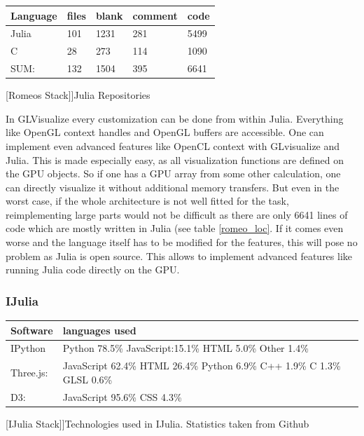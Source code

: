 \begin{table}[htbp]
    \centering
    \begin{tabular}{l|l|l|l|l}
        \hline
        \textbf{Language} & \textbf{files}    &   \textbf{blank}   &   \textbf{comment}    &  \textbf{code}\\
        \hline
        Julia  &  101   &    1231 &   281  &  5499\\
        C       &   28  &   273   &    114 &  1090\\
        \hline
        SUM: & 132  &  1504  &     395    &   6641\\
        \hline
    \end{tabular}
    [Romeos Stack]]{Julia Repositories}
    \label{table:romeo_loc}
\end{table}

In GLVisualize every customization can be done from within Julia.
Everything like OpenGL context handles and OpenGL buffers are accessible.
One can implement even advanced features like OpenCL context with GLvisualize and Julia.
This is made especially easy, as all visualization functions are defined on the GPU objects. So if one has a GPU array from some other calculation, one can directly visualize it without additional memory transfers.
But even in the worst case, if the whole architecture is not well fitted for the task, reimplementing large parts would not be difficult as there are only 6641 lines of code which are mostly written in Julia (see table \ref{romeo_loc}.
If it comes even worse and the language itself has to be modified for the features, this will pose no problem as Julia is open source.
This allows to implement advanced features like running Julia code directly on the \ac{GPU}.


\subsubsection{IJulia}


\begin{table}[htbp]
    \centering
    \begin{tabular}{l|l}
        \hline
        \textbf{Software} & \textbf{languages used}\\
        \hline
        IPython     & Python 78.5\% JavaScript:15.1\% HTML 5.0\% Other 1.4\%\\
        Three.js:   & JavaScript 62.4\% HTML 26.4\% Python 6.9\% C++ 1.9\% C 1.3\% GLSL 0.6\%\\
        D3:         & JavaScript 95.6\% CSS 4.3\%\\
        \hline
    \end{tabular}
    [IJulia Stack]]{Technologies used in IJulia. Statistics taken from Github}
    \label{table:ijuliastack}
\end{table}

